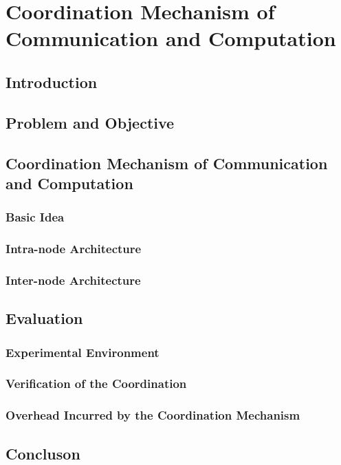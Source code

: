 \chapter{Coordination Mechanism of Communication and Computation}

\section{Introduction}

\section{Problem and Objective}

\section{Coordination Mechanism of Communication and Computation}

\subsection{Basic Idea}

\subsection{Intra-node Architecture}

\subsection{Inter-node Architecture}

\section{Evaluation}

\subsection{Experimental Environment}

\subsection{Verification of the Coordination}

\subsection{Overhead Incurred by the Coordination Mechanism}

\section{Concluson}
